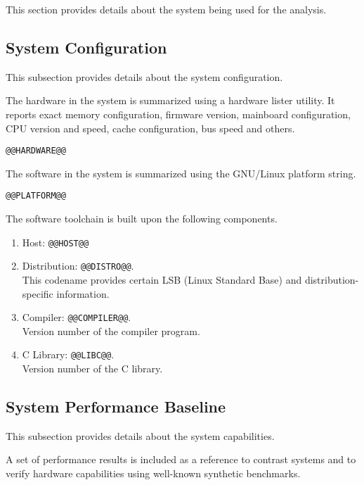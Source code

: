\documentclass[a4paper]{article}
\begin{document}
This section provides details about the system being used for the analysis.

\subsection{System Configuration}

This subsection provides details about the system configuration.

The hardware in the system is summarized using a hardware lister utility.
It reports exact memory configuration, firmware version, mainboard configuration, CPU version and speed, cache configuration, bus speed and others.

\begin{verbatim}
@@HARDWARE@@
\end{verbatim}

The software in the system is summarized using the GNU/Linux platform string.

\begin{verbatim}
@@PLATFORM@@
\end{verbatim}

The software toolchain is built upon the following components.

\begin{enumerate}
\item Host: {\tt @@HOST@@}
\item Distribution: {\tt @@DISTRO@@}. \\This codename provides certain LSB (Linux Standard Base) and distribution-specific information.
\item Compiler: {\tt @@COMPILER@@}. \\Version number of the compiler program.
\item C Library: {\tt @@LIBC@@}. \\Version number of the C library.
\end{enumerate}

\subsection{System Performance Baseline}

This subsection provides details about the system capabilities.

\smallskip

A set of performance results is included as a reference to contrast systems and to verify hardware capabilities using well-known synthetic benchmarks.
\end{document}
